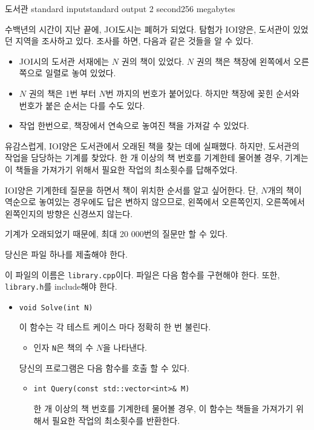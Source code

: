 \begin{problem}{도서관}
	{standard input}{standard output}
	{2 second}{256 megabytes}{}
	
	수백년의 시간이 지난 끝에, JOI도시는 폐허가 되었다. 탐험가 IOI양은, 도서관이 있었던 지역을 조사하고 있다. 조사를 하면, 다음과 같은 것들을 알 수 있다.
	
	\begin{itemize}
		\item JOI시의 도서관 서재에는 $N$ 권의 책이 있었다. $N$ 권의 책은 책장에 왼쪽에서 오른쪽으로 일렬로 놓여 있었다.
		\item $N$ 권의 책은 1번 부터 $N$번 까지의 번호가 붙어있다. 하지만 책장에 꽂힌 순서와 번호가 붙은 순서는 다를 수도 있다.
		\item 작업 한번으로, 책장에서 연속으로 놓여진 책을 가져갈 수 있었다.
	\end{itemize}

	유감스럽게, IOI양은 도서관에서 오래된 책을 찾는 데에 실패했다. 하지만, 도서관의 작업을 담당하는 기계를 찾았다. 한 개 이상의 책 번호를 기계한테 물어볼 경우, 기계는 이 책들을 가져가기 위해서 필요한 작업의 최소횟수를 답해주었다.
	
	IOI양은 기계한테 질문을 하면서 책이 위치한 순서를 알고 싶어한다. 단, $N$개의 책이 역순으로 놓여있는 경우에도 답은 변하지 않으므로, 왼쪽에서 오른쪽인지, 오른쪽에서 왼쪽인지의 방향은 신경쓰지 않는다.
	
	기계가 오래되었기 때문에, 최대 20 000번의 질문만 할 수 있다.
	
	\Specification
	
	당신은 파일 하나를 제출해야 한다.
	
	이 파일의 이름은 \texttt{library.cpp}이다. 파일은 다음 함수를 구현해야 한다. 또한, \texttt{library.h}를 include해야 한다.
	
	\begin{itemize}
		\item \texttt{void Solve(int N)}
		
		이 함수는 각 테스트 케이스 마다 정확히 한 번 불린다.
		\begin{itemize}
			\item 인자 \texttt{N}은 책의 수 $N$을 나타낸다.
		\end{itemize}
		
		당신의 프로그램은 다음 함수를 호출 할 수 있다.
		\begin{itemize}
			\item \texttt{int Query(const std::vector<int>\& M)}
			
			한 개 이상의 책 번호를 기계한테 물어볼 경우, 이 함수는 책들을 가져가기 위해서 필요한 작업의 최소횟수를 반환한다.
			

\end{itemize}
\end{itemize}
\end{problem}
